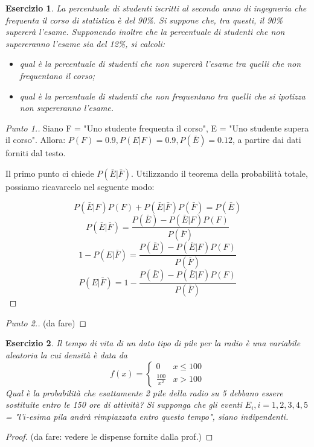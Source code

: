 \documentclass[12pt]{article}
\newtheorem{theorem}{Esercizio}
\renewcommand\qedsymbol{$\square$}
\begin{document}
\begin{theorem}
La percentuale di studenti iscritti al secondo anno di ingegneria che frequenta il corso di statistica è del 90\%. Si suppone che, tra questi, il 90\% supererà l'esame. Supponendo inoltre che la percentuale di studenti che non supereranno l'esame sia del 12\%, si calcoli:
\begin{itemize}
    \item qual è la percentuale di studenti che non supererà l'esame tra quelli che non frequentano il corso;
    \item qual è la percentuale di studenti che non frequentano tra quelli che si ipotizza non supereranno l'esame.
\end{itemize}
\end{theorem}

\renewcommand\qedsymbol{$\square$}

\begin{proof}[Punto 1.]
Siano F = "Uno studente frequenta il corso", E = "Uno studente supera il corso". Allora: $P(F) = 0.9, P(E|F) = 0.9, P(\bar{E}) = 0.12$, a partire dai dati forniti dal testo.

Il primo punto ci chiede $P(\bar{E}|\bar{F})$. Utilizzando il teorema della probabilità totale, possiamo ricavarcelo nel seguente modo:

$$
P(\bar{E}|F)P(F) + P(\bar{E}|\bar{F})P(\bar{F}) = P(\bar{E}) 
$$
$$
P(\bar{E}|\bar{F}) = \frac{P(\bar{E}) - P(\bar{E}|F)P(F)}{P(\bar{F})}
$$
$$
1 - P(E|\bar{F}) = \frac{P(\bar{E}) - P(\bar{E}|F)P(F)}{P(\bar{F})}
$$
$$
P(E|\bar{F}) = 1 - \frac{P(\bar{E}) - P(\bar{E}|F)P(F)}{P(\bar{F})}
$$
\end{proof}

\renewcommand\qedsymbol{$\blacksquare$}

\begin{proof}[Punto 2.]
(da fare)
\end{proof}

\begin{theorem}
Il tempo di vita di un dato tipo di pile per la radio è una variabile aleatoria la cui densità è data da
$$
f(x) = \begin{cases} 0 & x \le 100 \\ \frac{100}{x^2} & x > 100 \end{cases}
$$
Qual è la probabilità che esattamente 2 pile della radio su 5 debbano essere sostituite entro le 150 ore di attività? Si supponga che gli eventi $E_i, i = 1, 2, 3, 4, 5$ = "l'$i$-esima pila andrà rimpiazzata entro questo tempo", siano indipendenti.
\end{theorem}

\begin{proof}
(da fare: vedere le dispense fornite dalla prof.)
\end{proof}
\end{document}
